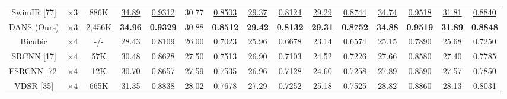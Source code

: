 \documentclass{ieeeaccess}
\begin{document}
\begin{table}
\begin{tabular}{|c|c|c|cc|cc|cc|cc|cc|cc|}
SwimIR [77] & $\times3$ &886K& \multicolumn{1}{c|}{\color{blue}\underline{34.89}} & {\color{blue}\underline{0.9312}} & \multicolumn{1}{c|}{30.77} &{\color{blue}\underline{0.8503}} & \multicolumn{1}{c|}{\color{blue}\underline{29.37}} & {\color{blue}\underline{0.8124}} & {\color{blue}\underline{29.29}} & {\color{blue}\underline{0.8744}}& \multicolumn{1}{c|}{\color{blue}\underline{34.74}} &{\color{blue}\underline{0.9518}} &\multicolumn{1}{c|}{\color{blue}\underline{31.81}} & {\color{blue}\underline{0.8840}}\\

DANS (Ours) & $\times3$ &2,456K& \multicolumn{1}{c|}{\color{red}\textbf{34.96}} &{\color{red}\textbf{0.9329}}& \multicolumn{1}{c|}{\color{blue}\underline{30.88}} & {\color{red}\textbf{0.8512}}& \multicolumn{1}{c|}{\color{red}\textbf{29.42}} &{\color{red}\textbf{0.8132}}& \multicolumn{1}{c|}{\color{red}\textbf{29.31}} &{\color{red}\textbf{0.8752}}& \multicolumn{1}{c|}{\color{red}\textbf{34.88}} &{\color{red}\textbf{0.9519}} &\multicolumn{1}{c|}{\color{red}\textbf{31.89}} &{\color{red}\textbf{0.8848}}\\

\hline

Bicubic&$\times4$ &-/-& \multicolumn{1}{c|}{28.43 } &0.8109 & \multicolumn{1}{c|}{26.00  } &0.7023& \multicolumn{1}{c|}{25.96 } & 0.6678  & \multicolumn{1}{c|}{23.14 } & 0.6574  & \multicolumn{1}{c|}{25.15} &0.7890

&\multicolumn{1}{c|}{25.68} &0.7250\\


SRCNN [17] & $\times4$  &57K& \multicolumn{1}{c|}{30.48 } &0.8628   & \multicolumn{1}{c|}{27.50 } &0.7513  &\multicolumn{1}{c|}{ 26.90 } & 0.7103 & \multicolumn{1}{c|}{24.52 } &0.7226 & \multicolumn{1}{c|}{27.66 } &0.8580
&\multicolumn{1}{c|}{ 27.40} &0.7785 \\

FSRCNN [72]& $\times4$ &12K& \multicolumn{1}{c|}{30.70} & 0.8657& \multicolumn{1}{c|}{27.59} &0.7535  &\multicolumn{1}{c|}{26.96} &0.7128 & \multicolumn{1}{c|}{24.60} &0.7258 & \multicolumn{1}{c|}{27.89 } &0.8590
&\multicolumn{1}{c|}{27.57} &0.7850 \\

VDSR [35]& $\times4$ &665K & \multicolumn{1}{c|}{31.35} &0.8838 & \multicolumn{1}{c|}{28.02} & 0.7678&\multicolumn{1}{c|}{27.29} &0.7252 & \multicolumn{1}{c|}{25.18} &0.7525 & \multicolumn{1}{c|}{28.82 } & 0.8860
&\multicolumn{1}{c|}{28.13} &0.8031 \\


\end{tabular}
\end{table}
\end{document}
